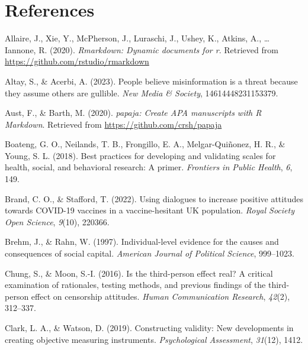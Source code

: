 \documentclass[
  ,jou,floatsintext]{apa6}
\newlength{\cslhangindent}
\newlength{\cslentryspacingunit} %
\newenvironment{CSLReferences}[2] %
 {%
  \setlength{\parindent}{0pt}
  \ifodd #1
  \let\oldpar\par
  \def\par{\hangindent=\cslhangindent\oldpar}
  \fi
  \setlength{\parskip}{#2\cslentryspacingunit}
 }%
 {}
\begin{document}
\hypertarget{references}{%
\section*{References}\label{references}}

\hypertarget{refs}{}
\begin{CSLReferences}{1}{0}
\leavevmode{}%
Allaire, J., Xie, Y., McPherson, J., Luraschi, J., Ushey, K., Atkins, A., \ldots{} Iannone, R. (2020). \emph{Rmarkdown: Dynamic documents for r}. Retrieved from \url{https://github.com/rstudio/rmarkdown}

\leavevmode{}%
Altay, S., \& Acerbi, A. (2023). People believe misinformation is a threat because they assume others are gullible. \emph{New Media \& Society}, 14614448231153379.

\leavevmode{}%
Aust, F., \& Barth, M. (2020). \emph{{papaja}: {Create} {APA} manuscripts with {R Markdown}}. Retrieved from \url{https://github.com/crsh/papaja}

\leavevmode{}%
Boateng, G. O., Neilands, T. B., Frongillo, E. A., Melgar-Quiñonez, H. R., \& Young, S. L. (2018). Best practices for developing and validating scales for health, social, and behavioral research: A primer. \emph{Frontiers in Public Health}, \emph{6}, 149.

\leavevmode{}%
Brand, C. O., \& Stafford, T. (2022). Using dialogues to increase positive attitudes towards COVID-19 vaccines in a vaccine-hesitant UK population. \emph{Royal Society Open Science}, \emph{9}(10), 220366.

\leavevmode{}%
Brehm, J., \& Rahn, W. (1997). Individual-level evidence for the causes and consequences of social capital. \emph{American Journal of Political Science}, 999--1023.

\leavevmode{}%
Chung, S., \& Moon, S.-I. (2016). Is the third-person effect real? A critical examination of rationales, testing methods, and previous findings of the third-person effect on censorship attitudes. \emph{Human Communication Research}, \emph{42}(2), 312--337.

\leavevmode{}%
Clark, L. A., \& Watson, D. (2019). Constructing validity: New developments in creating objective measuring instruments. \emph{Psychological Assessment}, \emph{31}(12), 1412.


\end{CSLReferences}
\end{document}
